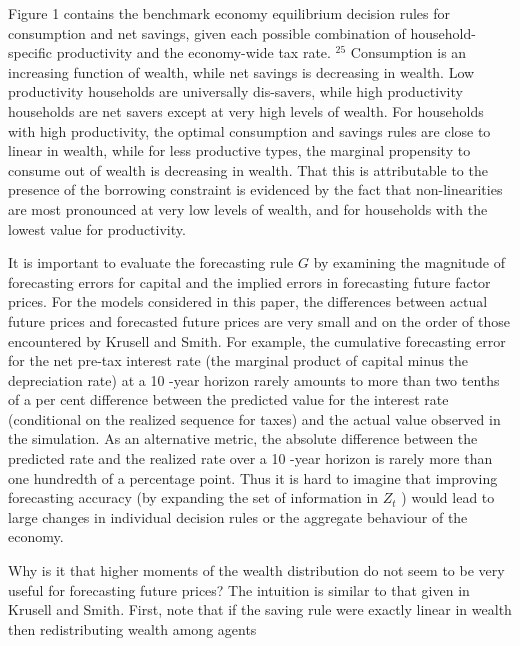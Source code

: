 \documentclass[11pt]{article}
\begin{document}
Figure 1 contains the benchmark economy equilibrium decision rules for consumption and net savings, given each possible combination of household-specific productivity and the economy-wide tax rate. ${ }^{25}$ Consumption is an increasing function of wealth, while net savings is decreasing in wealth. Low productivity households are universally dis-savers, while high productivity households are net savers except at very high levels of wealth. For households with high productivity, the optimal consumption and savings rules are close to linear in wealth, while for less productive types, the marginal propensity to consume out of wealth is decreasing in wealth. That this is attributable to the presence of the borrowing constraint is evidenced by the fact that non-linearities are most pronounced at very low levels of wealth, and for households with the lowest value for productivity.

It is important to evaluate the forecasting rule $G$ by examining the magnitude of forecasting errors for capital and the implied errors in forecasting future factor prices. For the models considered in this paper, the differences between actual future prices and forecasted future prices are very small and on the order of those encountered by Krusell and Smith. For example, the cumulative forecasting error for the net pre-tax interest rate (the marginal product of capital minus the depreciation rate) at a 10 -year horizon rarely amounts to more than two tenths of a per cent difference between the predicted value for the interest rate (conditional on the realized sequence for taxes) and the actual value observed in the simulation. As an alternative metric, the absolute difference between the predicted rate and the realized rate over a 10 -year horizon is rarely more than one hundredth of a percentage point. Thus it is hard to imagine that improving forecasting accuracy (by expanding the set of information in $Z_{t}$ ) would lead to large changes in individual decision rules or the aggregate behaviour of the economy.

Why is it that higher moments of the wealth distribution do not seem to be very useful for forecasting future prices? The intuition is similar to that given in Krusell and Smith. First, note that if the saving rule were exactly linear in wealth then redistributing wealth among agents
\end{document}
